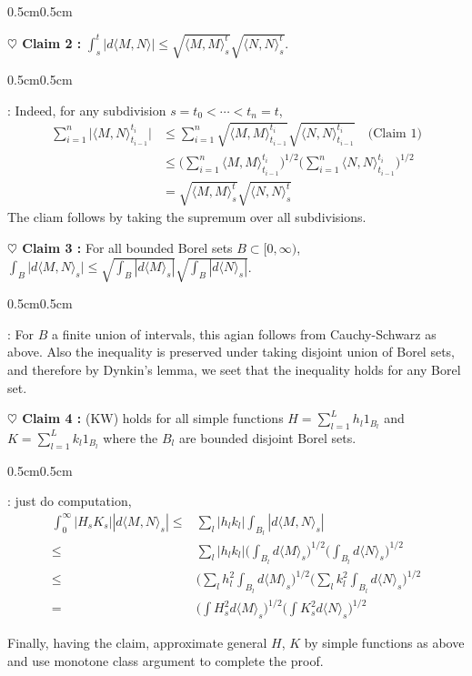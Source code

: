 \documentclass[12pt,a4paper]{article}
\newenvironment{proof}
{\begin{changemargin}{0.5cm}{0.5cm} 
	}%
	{\end{changemargin}
}
\newenvironment{subproof}
{\begin{changemargin}{0.5cm}{0.5cm} 
	}%
	{\end{changemargin}
}
\newenvironment{p}
{\begin{proof} 
	}%
	{\end{proof}
}
\begin{document}
\begin{p}
\textbf{$\heartsuit$ Claim 2 :} $\int_s^t |d\langle M, N \rangle| \leq \sqrt{\langle M, M \rangle_s^t} \sqrt{\langle N,N \rangle_s^t}$.
\begin{subproof}
: Indeed, for any subdivision $s=t_0 < \cdots < t_n =t$,
\begin{align*}
\sum_{i=1}^n \big| \langle M, N \rangle_{t_{i-1}}^{t_i} \big| &\leq \sum_{i=1}^n \sqrt{\langle M, M \rangle_{t_{i-1}}^{t_i}} \sqrt{\langle N, N \rangle_{t_{i-1}}^{t_i}} \quad \text{(Claim 1)}\\
&\leq \Big(\sum_{i=1}^n \langle M, M \rangle_{t_{i-1}}^{t_i}\Big)^{1/2} \Big(\sum_{i=1}^n \langle N, N \rangle_{t_{i-1}}^{t_i}\Big)^{1/2} \\
&=\sqrt{\langle M, M \rangle_s^t} \sqrt{\langle N, N \rangle_s^t}
\end{align*}
The cliam follows by taking the supremum over all subdivisions.
\end{subproof}
\textbf{$\heartsuit$ Claim 3 :} For all bounded Borel sets $B\subset [0, \infty)$, $\int_B \big| d\langle M, N \rangle_s \big| \leq \sqrt{\int_B |d\langle M\rangle_s|} \sqrt{\int_B |d\langle N\rangle_s|}$. 
\begin{subproof}
: For $B$ a finite union of intervals, this agian follows from Cauchy-Schwarz as above. Also the inequality is preserved under taking disjoint union of Borel sets, and therefore by Dynkin's lemma, we seet that the inequality holds for any Borel set.
\end{subproof}
\textbf{$\heartsuit$ Claim 4 :} (KW) holds for all simple functions $H= \sum_{l=1}^L h_l 1_{B_l}$ and $K= \sum_{l=1}^L k_l 1_{B_l}$ where the $B_l$ are bounded disjoint Borel sets.
\begin{subproof}
: just do computation,
\begin{align*}
\int_0^{\infty} |H_s K_s| |d\langle M, N \rangle_s| \leq & \sum_{l} |h_l k_l| \int_{B_l} |d\langle M, N \rangle_s| \\
\leq & \sum_l |h_l k_l| \Big(\int_{B_l} d\langle M \rangle_s\Big)^{1/2} \Big(\int_{B_l} d\langle N \rangle_s\Big)^{1/2} \\
\leq & \Big( \sum_l h_l^2 \int_{B_l} d\langle M \rangle_s \Big)^{1/2} \Big( \sum_l k_l^2 \int_{B_l} d\langle N \rangle_s \Big)^{1/2} \\
= & \Big( \int H_s^2 d\langle M \rangle_s \Big)^{1/2} \Big( \int K_s^2 d\langle N \rangle_s \Big)^{1/2} 
\end{align*}
\end{subproof}
Finally, having the claim, approximate general $H$, $K$ by simple functions as above and use monotone class argument to complete the proof.

\eop
\end{p}
\end{document}
